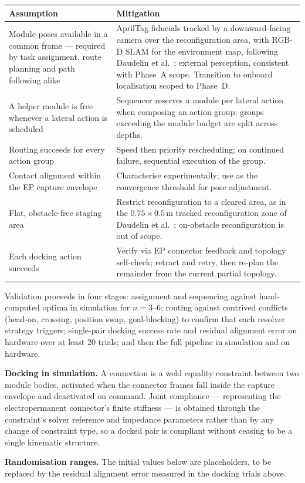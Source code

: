\documentclass[11pt,a4paper]{article}
\newif\ifreview
\newcommand{\pending}[1]{\ifreview{\color{blue}#1}\else#1\fi}
\newcounter{gsec}
\newcounter{gsub}
\newcommand{\curgsec}{}
\newcommand{\gsep}{\texorpdfstring{\quad}{ }}
\newcommand{\gtocsub}[2]{%
  \phantomsection
  \addcontentsline{toc}{subsection}{#1\gsep #2}%
}
\newcommand{\gsubsection}[1]{%
  \refstepcounter{gsub}%
  \edef\gsublbl{\curgsec.\thegsub}%
  \expandafter\gtocsub\expandafter{\gsublbl}{#1}%
  \subsection*{\gsublbl\quad #1}%
}
\begin{document}
\begin{longtable}{@{}L{0.44\textwidth} L{0.48\textwidth}@{}}
\toprule
\textbf{Assumption} & \textbf{Mitigation} \\
\midrule
\endhead
Module poses available in a common frame --- required by task assignment, route
planning and path following alike &
  AprilTag fiducials tracked by a downward-facing camera over the
  reconfiguration area, with RGB-D SLAM for the environment map, following
  Daudelin et al.\ \cite{daudelin2018}; external perception, consistent with
  Phase~A scope. Transition to onboard localisation scoped to Phase~D. \\
A helper module is free whenever a lateral action is scheduled &
  Sequencer reserves a module per lateral action when composing an action
  group; groups exceeding the module budget are split across depths. \\
Routing succeeds for every action group &
  Speed then priority rescheduling; on continued failure, sequential execution
  of the group. \\
Contact alignment within the EP capture envelope &
  Characterise experimentally; use as the convergence threshold for pose
  adjustment. \\
Flat, obstacle-free staging area &
  Restrict reconfiguration to a cleared area, as in the
  $0.75 \times 0.5$\,m tracked reconfiguration zone of Daudelin et al.\
  \cite{daudelin2018}; on-obstacle reconfiguration is out of scope. \\
Each docking action succeeds &
  Verify via EP connector feedback and topology self-check; retract and retry,
  then re-plan the remainder from the current partial topology. \\
\bottomrule
\end{longtable}

Validation proceeds in four stages: assignment and sequencing against
hand-computed optima in simulation for $n = 3$--$6$; routing against contrived
conflicts (head-on, crossing, position swap, goal-blocking) to confirm that each
resolver strategy triggers; single-pair docking success rate and residual
alignment error on hardware over at least 20 trials; and then the full pipeline
in simulation and on hardware.

\pending{}

\pending{%
\noindent\textbf{Docking in simulation.} A connection is a weld equality
constraint between two module bodies, activated when the connector frames fall
inside the capture envelope and deactivated on command. Joint compliance ---
representing the electropermanent connector's finite stiffness --- is obtained
through the constraint's solver reference and impedance parameters rather than
by any change of constraint type, so a docked pair is compliant without ceasing
to be a single kinematic structure.

\noindent\textbf{Randomisation ranges.} The initial values below are
placeholders, to be replaced by the residual alignment error measured in the
docking trials above.
}
\end{document}
